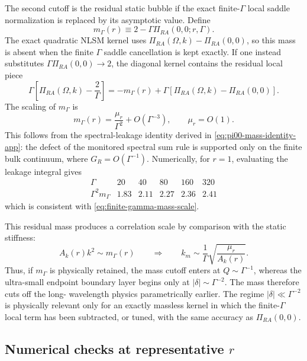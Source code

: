 \documentclass[aps,prx,preprint,amsmath,amssymb]{revtex4-2}
\begin{document}
The second cutoff is the residual static bubble if the exact finite-\(\Gamma\)
local saddle normalization is replaced by its asymptotic value.  Define
\begin{equation}
\label{eq:finite-gamma-mass-def}
m_\Gamma(r)\equiv 2-\Gamma\Pi_{RA}(0,0;r,\Gamma).
\end{equation}
The exact quadratic NLSM kernel uses
\(\Pi_{RA}(\Omega,k)-\Pi_{RA}(0,0)\), so this mass is absent when the finite
\(\Gamma\) saddle cancellation is kept exactly.  If one instead substitutes
\(\Gamma\Pi_{RA}(0,0)\to2\), the diagonal kernel contains the residual local
piece
\begin{equation}
\Gamma\left[\Pi_{RA}(\Omega,k)-\frac{2}{\Gamma}\right]
=
-m_\Gamma(r)
+\Gamma\left[\Pi_{RA}(\Omega,k)-\Pi_{RA}(0,0)\right].
\end{equation}
The scaling of \(m_\Gamma\) is
\begin{equation}
\label{eq:finite-gamma-mass-scale}
m_\Gamma(r)=\frac{\mu_r}{\Gamma^2}+O(\Gamma^{-3}),
\qquad
\mu_r=O(1).
\end{equation}
This follows from the spectral-leakage identity derived in
\eqref{eq:pi00-mass-identity-app}: the defect of the monitored spectral sum
rule is supported only on the finite bulk continuum, where
\(G_R=O(\Gamma^{-1})\).  Numerically, for \(r=1\), evaluating the leakage
integral gives
\[
\begin{array}{c|ccccc}
\Gamma&20&40&80&160&320\\
\hline
\Gamma^2 m_\Gamma&1.83&2.11&2.27&2.36&2.41
\end{array}
\]
which is consistent with \eqref{eq:finite-gamma-mass-scale}.

This residual mass produces a correlation scale by comparison with the static
stiffness:
\[
A_k(r)k^2\sim m_\Gamma(r)
\qquad\Rightarrow\qquad
k_m\sim \frac{1}{\Gamma}\sqrt{\frac{\mu_r}{A_k(r)}}.
\]
Thus, if \(m_\Gamma\) is physically retained, the mass cutoff enters at
\(Q\sim\Gamma^{-1}\), whereas the ultra-small endpoint boundary layer begins
only at \(|\delta|\sim\Gamma^{-2}\).  The mass therefore cuts off the long-
wavelength physics parametrically earlier.  The regime
\(|\delta|\ll\Gamma^{-2}\) is physically relevant only for an exactly massless
kernel in which the finite-\(\Gamma\) local term has been subtracted, or tuned,
with the same accuracy as \(\Pi_{RA}(0,0)\).

\subsection{Numerical checks at representative \texorpdfstring{$r$}{r}}
\end{document}
